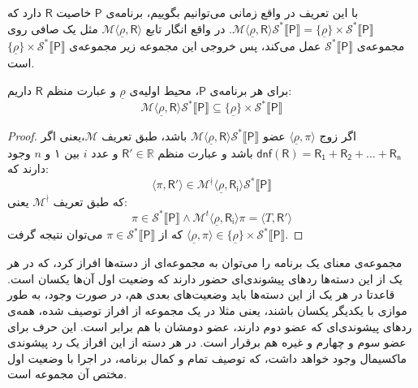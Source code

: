 با این تعریف در واقع زمانی می‌توانیم بگوییم، برنامه‌ی $\mathsf{P}$ خاصیت $\mathsf{R}$ دارد \break که 
$\mathcal{M}\langle \underline{\rho} , \mathsf{R} \rangle \mathcal{S}^* \llbracket \mathsf{P} \rrbracket = 
\{\underline{\rho}\} \times \mathcal{S}^* \llbracket \mathsf{P} \rrbracket$.
در واقع انگار تابع 
$\mathcal{M} \langle \underline{\rho} , \mathsf{R} \rangle$
مثل یک صافی روی مجموعه‌ی 
$\mathcal{S}^* \llbracket \mathsf{P} \rrbracket$
عمل می‌کند، پس خروجی این مجموعه زیر مجموعه‌ی $\{\underline{\rho}\} \times \mathcal{S}^* \llbracket \mathsf{P} \rrbracket$ است.
\begin{thm}
	برای هر برنامه‌ی $\mathsf{P}$، محیط اولیه‌ی $\underline{\rho}$ و عبارت منظم $\mathsf{R}$ داریم:
	$$\mathcal{M}\langle \underline{\rho},\mathsf{R} \rangle \mathcal{S}^* \llbracket \mathsf{P} \rrbracket \subseteq \{\underline{\rho}\} \times \mathcal{S}^* \llbracket \mathsf{P}\rrbracket$$
\end{thm}

\begin{proof}
	اگر زوج
	$\langle \underline{\rho}, \pi \rangle$ 
	عضو 
	$\mathcal{M}\langle \underline{\rho},\mathsf{R} \rangle \mathcal{S}^* \llbracket \mathsf{P} \rrbracket $
	باشد، طبق تعریف $\mathcal{M}$،\break یعنی اگر 
	$\mathsf{dnf(R)=R_1+R_2+...+R_n}$
	باشد و عبارت منظم $\mathsf{R'} \in \mathbb{R}$ و عدد $i$ بین ۱ و $n$ وجود دارند که: 
	$$\langle \pi , \mathsf{R'} \rangle \in \mathcal{M}^\nmid \langle \underline{\rho},\mathsf{R_i} \rangle \mathcal{S}^* \llbracket \mathsf{P} \rrbracket$$
	که طبق تعریف $\mathcal{M^\nmid}$ یعنی: 
	$$\pi \in \mathcal{S}^* \llbracket \mathsf{P} \rrbracket \land \mathcal{M}^t \langle \underline{\rho},\mathsf{R_i}\rangle \pi = \langle \mathit{T},\mathsf{R'} \rangle$$
که از 
$\pi \in \mathcal{S}^* \llbracket \mathsf{P} \rrbracket$
می‌توان نتیجه گرفت 
$\langle \underline{\rho}, \pi \rangle \in \{\underline{\rho}\} \times \mathcal{S}^* \llbracket \mathsf{P} \rrbracket$.

\end{proof}


مجموعه‌ی معنای یک برنامه را می‌توان به مجموعه‌ای از دسته‌ها افراز کرد، که در هر یک از این دسته‌ها ردهای پیشوندی‌ای حضور دارند که وضعیت اول آن‌ها یکسان است. قاعدتا در هر یک از این دسته‌ها باید وضعیت‌های بعدی هم، در صورت وجود، به طور موازی با یکدیگر یکسان باشند، یعنی مثلا در یک مجموعه از افراز توصیف شده، همه‌ی ردهای پیشوندی‌ای که عضو دوم دارند، عضو دومشان با هم برابر است. این حرف برای عضو سوم و چهارم و غیره هم برقرار است. در هر دسته از این افراز یک رد پیشوندی ماکسیمال وجود خواهد داشت، که توصیف تمام و کمال برنامه، در اجرا با وضعیت اول مختص آن مجموعه است.

